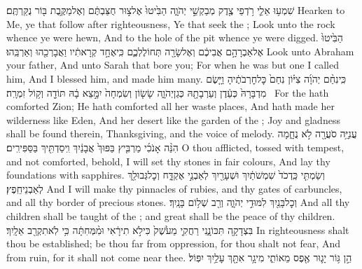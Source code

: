 \newperek
{}
{שִׁמְע֥וּ אֵלַ֛י רֹ֥דְפֵי צֶ֖דֶק מְבַקְשֵׁ֣י יְהֹוָ֑ה הַבִּ֙יטוּ֙ אֶל\maqqaf צ֣וּר חֻצַּבְתֶּ֔ם וְאֶל\maqqaf מַקֶּ֥בֶת בּ֖וֹר נֻקַּרְתֶּֽם׃}
{Hearken to Me, ye that follow after righteousness, Ye that seek the \lord; Look unto the rock whence ye were hewn, And to the hole of the pit whence ye were digged.}
{הַבִּ֙יטוּ֙ אֶל\maqqaf אַבְרָהָ֣ם אֲבִיכֶ֔ם וְאֶל\maqqaf שָׂרָ֖ה תְּחוֹלֶלְכֶ֑ם כִּֽי\maqqaf אֶחָ֣ד קְרָאתִ֔יו וַאֲבָרְכֵ֖הוּ וְאַרְבֵּֽהוּ׃}
{Look unto Abraham your father, And unto Sarah that bore you; For when he was but one I called him, And I blessed him, and made him many.}
{כִּֽי\maqqaf נִחַ֨ם יְהֹוָ֜ה צִיּ֗וֹן נִחַם֙ כׇּל\maqqaf חׇרְבֹתֶ֔יהָ וַיָּ֤שֶׂם מִדְבָּרָהּ֙ כְּעֵ֔דֶן וְעַרְבָתָ֖הּ כְּגַן\maqqaf יְהֹוָ֑ה שָׂשׂ֤וֹן וְשִׂמְחָה֙ יִמָּ֣צֵא בָ֔הּ תּוֹדָ֖ה וְק֥וֹל זִמְרָֽה׃ \setuma }
{For the \lord\space hath comforted Zion; He hath comforted all her waste places, And hath made her wilderness like Eden, And her desert like the garden of the \lord; Joy and gladness shall be found therein, Thanksgiving, and the voice of melody.}
\newperek
{}
\label{haft_47}
\setcounter{chap}{54}
\setcounter{verse}{11}
{עֲנִיָּ֥ה סֹעֲרָ֖ה לֹ֣א נֻחָ֑מָה הִנֵּ֨ה אָנֹכִ֜י מַרְבִּ֤יץ בַּפּוּךְ֙ אֲבָנַ֔יִךְ וִֽיסַדְתִּ֖יךְ בַּסַּפִּירִֽים׃}
{O thou afflicted, tossed with tempest, and not comforted, behold, I will set thy stones in fair colours, And lay thy foundations with sapphires.}
{וְשַׂמְתִּ֤י כַּֽדְכֹד֙ שִׁמְשֹׁתַ֔יִךְ וּשְׁעָרַ֖יִךְ לְאַבְנֵ֣י אֶקְדָּ֑ח וְכׇל\maqqaf גְּבוּלֵ֖ךְ לְאַבְנֵי\maqqaf חֵֽפֶץ׃}
{And I will make thy pinnacles of rubies, and thy gates of carbuncles, and all thy border of precious stones.}
{וְכׇל\maqqaf בָּנַ֖יִךְ לִמּוּדֵ֣י יְהֹוָ֑ה וְרַ֖ב שְׁל֥וֹם בָּנָֽיִךְ׃}
{And all thy children shall be taught of the \lord; and great shall be the peace of thy children.}
{בִּצְדָקָ֖ה תִּכּוֹנָ֑נִי רַחֲקִ֤י מֵעֹ֙שֶׁק֙ כִּי\maqqaf לֹ֣א תִירָ֔אִי וּמִ֨מְּחִתָּ֔ה כִּ֥י לֹֽא\maqqaf תִקְרַ֖ב אֵלָֽיִךְ׃}
{In righteousness shalt thou be established; be thou far from oppression, for thou shalt not fear, And from ruin, for it shall not come near thee.}
{הֵ֣ן גּ֥וֹר יָג֛וּר אֶ֖פֶס מֵאוֹתִ֑י מִי\maqqaf גָ֥ר אִתָּ֖ךְ עָלַ֥יִךְ יִפּֽוֹל׃}
